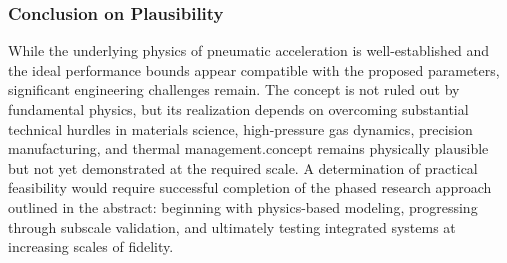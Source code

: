 \documentclass{article}
\begin{document}
\n\subsubsection{Conclusion on Plausibility}
While the underlying physics of pneumatic acceleration is well-established and the ideal performance bounds appear compatible with the proposed parameters, significant engineering challenges remain. The concept is not ruled out by fundamental physics, but its realization depends on overcoming substantial technical hurdles in materials science, high-pressure gas dynamics, precision manufacturing, and thermal management.\n\nThe concept remains physically plausible but not yet demonstrated at the required scale. A determination of practical feasibility would require successful completion of the phased research approach outlined in the abstract: beginning with physics-based modeling, progressing through subscale validation, and ultimately testing integrated systems at increasing scales of fidelity.\n
\end{document}
